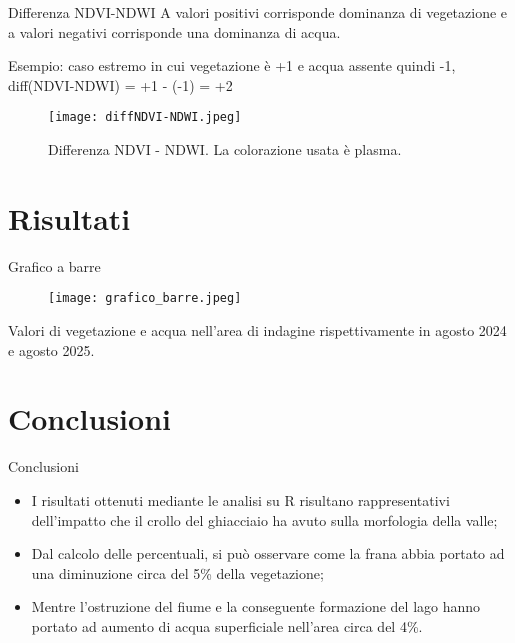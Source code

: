 \documentclass{beamer} %
\begin{document}
\begin{frame}{Differenza NDVI-NDWI}
    A valori positivi corrisponde dominanza di vegetazione e a valori negativi corrisponde una dominanza di acqua.
    
    \bigskip Esempio: caso estremo in cui vegetazione è +1 e acqua assente quindi -1, diff(NDVI-NDWI) = +1 - (-1) = +2

    \begin{figure}
        \centering
        \texttt{[image: diffNDVI-NDWI.jpeg]}
        \caption{Differenza NDVI - NDWI. La colorazione usata è plasma.}
        \label{fig:placeholder}
    \end{figure}
\end{frame}

\section{Risultati}
\begin{frame}{Grafico a barre}
    \begin{figure}
        \centering
        \texttt{[image: grafico\_barre.jpeg]}
        \label{fig:placeholder}
    \end{figure}
    \begin{center}
        \vspace{-0.5cm}Valori di vegetazione e acqua nell'area di indagine rispettivamente in agosto 2024 e agosto 2025.
    \end{center}
\end{frame}

\section{Conclusioni}
\begin{frame}{Conclusioni}
    \begin{itemize}
        \item I risultati ottenuti mediante le analisi su R risultano rappresentativi dell'impatto che il crollo del ghiacciaio ha avuto sulla morfologia della valle;
        \bigskip
        \pause \item Dal calcolo delle percentuali, si può osservare come la frana abbia portato ad una diminuzione circa del 5\% della vegetazione;
       \bigskip
       \pause \item Mentre l'ostruzione del fiume e la conseguente formazione del lago hanno portato ad aumento di acqua superficiale nell'area circa del 4\%.
    \end{itemize}
\end{frame}
\end{document}
